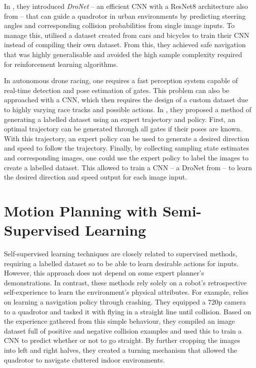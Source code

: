 In \cite{dronet}, they introduced \textit{DroNet} -- an efficient CNN with a ResNet8 architecture also from \cite{KaimingResNet} -- that can guide a quadrotor in urban environments by predicting steering angles and corresponding collision probabilities from single image inputs. To manage this, \cite{dronet} utilised a dataset created from cars and bicycles to train their CNN instead of compiling their own dataset.
From this, they achieved safe navigation that was highly generalisable and avoided the high sample complexity required for reinforcement learning algorithms.

In autonomous drone racing, one requires a fast perception system capable of real-time detection and pose estimation of gates. This problem can also be approached with a CNN, which then requires the design of a custom dataset due to highly varying race tracks and possible actions. In \cite{supervised_DeepDroneRacing}, they proposed a method of generating a labelled dataset using an expert trajectory and policy. First, an optimal trajectory can be generated through all gates if their poses are known.
With this trajectory, an expert policy can be used to generate a desired direction and speed to follow the trajectory. Finally, by collecting sampling state estimates and corresponding images, one could use the expert policy to label the images to create a labelled dataset. This allowed \cite{supervised_DeepDroneRacing} to train a CNN -- a DroNet from \cite{dronet} -- to learn the desired direction and speed output for each image input. 

\section{Motion Planning with Semi-Supervised Learning}
\label{sec:3_semi_supervised_learning}
Self-supervised learning techniques are closely related to supervised methods, requiring a labelled dataset so to be able to learn desirable actions for inputs. However, this approach does not depend on some expert planner's demonstrations. In contrast, these methods rely solely on a robot's retrospective self-experience to learn the environment's physical attributes.
For example, \cite{learning_to_fly_by_crashing} relies on learning a navigation policy through crashing. They equipped a 720p camera to a quadrotor and tasked it with flying in a straight line until collision. Based on the experience gathered from this simple behaviour, they compiled an image dataset full of positive and negative collision examples and used this to train a CNN to predict whether or not to go straight. By further cropping the images into left and right halves, they created a turning mechanism that allowed the quadrotor to navigate cluttered indoor environments.


